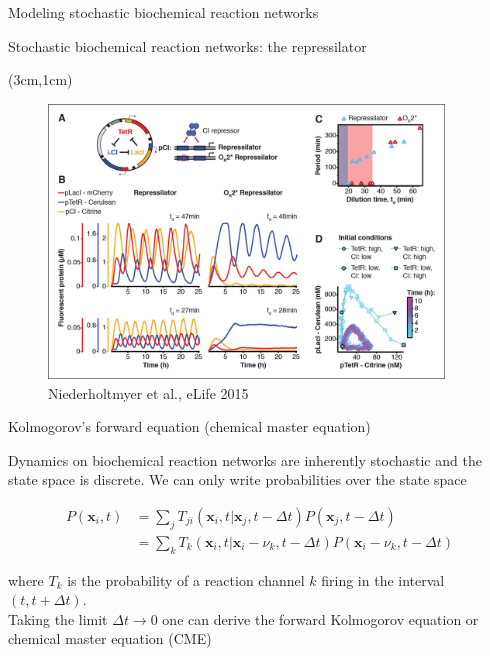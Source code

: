 \documentclass[aspectratio=1610]{beamer}					%
\begin{document}
\begin{section}{Modeling stochastic biochemical reaction networks}

\begin{frame}{Stochastic biochemical reaction networks: the repressilator}
\begin{textblock*}{10.5cm}(3cm,1cm)
\begin{figure}
\includegraphics[width=10.5cm]{repressilator.jpg}
\caption{Niederholtmyer et al., eLife 2015}
\end{figure}
\end{textblock*}
\end{frame}


\begin{frame}{Kolmogorov's forward equation (chemical master equation)}

Dynamics on biochemical reaction networks are inherently stochastic and the state space is discrete. We can only write probabilities over the state space

\vspace{0.1in}

\begin{align*}
P(\mathbf{x}_{i},t) &= \sum_{j} T_{ji}(\mathbf{x}_{i},t|\mathbf{x}_{j},t-\Delta t)P(\mathbf{x}_{j},t-\Delta t)\\ 
&= \sum_{k} T_{k}(\mathbf{x}_{i},t|\mathbf{x}_{i}-\nu_{k},t-\Delta t)P(\mathbf{x}_{i}-\nu_{k},t-\Delta t)
\end{align*}

where $T_{k}$ is the probability of a reaction channel $k$ firing in the interval $(t,t+\Delta t)$.\\
\vspace{0.1in}
Taking the limit $\Delta t \rightarrow 0$ one can derive the forward Kolmogorov equation or chemical master equation (CME)


\end{frame}
\end{section}
\end{document}
